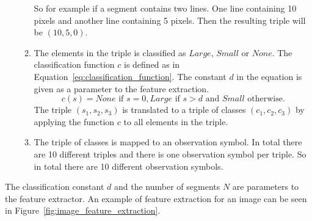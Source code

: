 \begin{enumerate}
\begin{enumerate}
    So for example if a segment contains two lines. 
    One line containing 10 pixels and another line containing 5 pixels. 
    Then the resulting triple will be $(10,5,0)$.
    \item The elements in the triple is classified as $Large$, $Small$ or $None$. 
    The classification function $c$ is defined as in Equation~\ref{eq:classification_function}. 
    The constant $d$ in the equation is given as a parameter to the feature extraction.
    \begin{equation}\label{eq:classification_function}
    c(s) = None \text{ if } s = 0, Large \text{ if } s > d \text{ and } Small \text{ otherwise}.
    \end{equation}
    The triple $(s_{1},s_{2},s_{3})$ is translated to a triple of classes $(c_{1},c_{2},c_{3})$ by applying the function $c$ to all elements in the triple.
    \item The triple of classes is mapped to an observation symbol.
    In total there are 10 different triples and there is one observation symbol per triple. 
    So in total there are 10 different observation symbols. 
  \end{enumerate}  
\end{enumerate}

The classification constant $d$ and the number of segments $N$ are parameters to the feature extractor. 
An example of feature extraction for an image can be seen in Figure~\ref{fig:image_feature_extraction}.